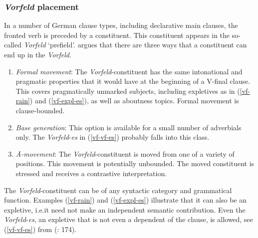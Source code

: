 \documentclass[output=paper]{langsci/langscibook}
\begin{document}
\ea
{}
\label{V2-particle-fronted}
\z
\z


\subsubsection{\textit{Vorfeld} placement}\label{sec-VorfeldPlacement}

In a number of  German clause types, including declarative main clauses, the fronted verb is preceded by a constituent. This constituent appears in the so-called \textit{Vorfeld} `prefield'. \cite{Frey06-Contrast} argues that there are three ways that a constituent can end up in the \textit{Vorfeld}.

\begin{enumerate}
\item \textit{Formal movement}: The \textit{Vorfeld}-constituent has the same intonational and pragmatic properties that it would have at the beginning of a V-final clause. This covers pragmatically unmarked subjects, including expletives as in (\ref{vf-rain}) and (\ref{vf-expl-es}), as well as aboutness topics. Formal movement is clause-bounded.

\item \textit{Base generation}: This option is available for a small number of adverbials only. The \textit{Vorfeld}-\textit{es} in (\ref{vf-vf-es}) probably falls into this class.

\item \textit{Ā-movement}: The \textit{Vorfeld}-constituent is moved from one of a variety of positions. This movement is potentially unbounded. The moved constituent is stressed and receives a contrastive interpretation.
\end{enumerate}

The \textit{Vorfeld}-constituent can be of any syntactic category and grammatical function. Examples (\ref{vf-rain}) and (\ref{vf-expl-es}) illustrate that it can also be an expletive, i.e.\@ it need not make an independent semantic contribution. Even the \textit{Vorfeld}-\textit{es}, an expletive that is not even a dependent of the clause, is allowed, see (\ref{vf-vf-es}) from \citeauthor{Mueller:13} (\citeyear{Mueller:13}: 174).
\end{document}

